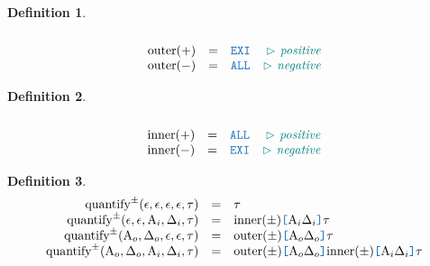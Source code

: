 \documentclass[acmsmall]{acmart}
\theoremstyle{definition}
\newtheorem{definition}{Definition}[section]
\begin{document}
\begin{definition}
  \[\begin{array}{rclr}
    \\
    \text{outer}(+) 
    &=& 
    \obj{EXI} 
    & \C{positive} 
    \\
    \text{outer}(-) 
    &=& 
    \obj{ALL} 
    & \C{negative} 
  \end{array}\]
\end{definition}

\begin{definition}
  \[\begin{array}{rclr}
    \\
    \text{inner}(+) 
    &=& 
    \obj{ALL} 
    & \C{positive} 
    \\
    \text{inner}(-) 
    &=& 
    \obj{EXI} 
    & \C{negative} 
  \end{array}\]
\end{definition}

\begin{definition}
  \[\begin{array}{rclr}
    \text{quantify}^{\pm}(\epsilon, \epsilon, \epsilon, \epsilon, \tau) 
    &=& 
    \tau
    \\
    \text{quantify}^{\pm}(\epsilon, \epsilon, \Alpha_i, \Delta_i, \tau) 
    &=& 
    \text{inner}(\pm)\obj{[}\Alpha_i\obj{ }\Delta_i\obj{]}\tau
    \\
    \text{quantify}^{\pm}(\Alpha_o, \Delta_o, \epsilon, \epsilon, \tau) 
    &=& 
    \text{outer}(\pm)\obj{[}\Alpha_o\obj{ }\Delta_o\obj{]}\tau
    \\
    \text{quantify}^{\pm}(\Alpha_o, \Delta_o, \Alpha_i, \Delta_i, \tau) 
    &=& 
    \text{outer}(\pm)\obj{[}\Alpha_o\obj{ }\Delta_o\obj{]}
    \text{inner}(\pm)\obj{[}\Alpha_i\obj{ }\Delta_i\obj{]}
    \tau
  \end{array}\]
\end{definition}
\end{document}
